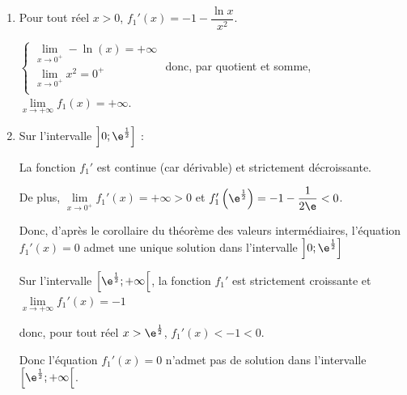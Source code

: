 \begin{enumerate}
\begin{enumerate}
			De plus $\begin{aligned}[t] f_1'\left( \e^{\frac{1}{2}}\right) & =- 1-  \dfrac{ \ln \left( \e^{\frac{1}{2}}\right)  }{ \left(\e^{\frac{1}{2}}\right)^2 }\\
			& = -1- \dfrac{ \frac{1}{2} }{ \e^1}\\
		   & = -1- \dfrac{ 1 }{ 2 \e}
		   	\end{aligned}$
	
		
		On a donc : 
	
		\hfill~
	\hfill~
		
		
		
		
		
		\item   Pour tout réel $x>0$, \quad $f_{1}'(x)= -1-\dfrac{\ln x}{x^2}$. 
		
		
		$\begin{cases}
			\lim\limits_{x\to 0^+} - \ln(x)= +\infty \\
			\lim\limits_{x\to 0^+ } {x^2}= 0^+ \\
		\end{cases}$ donc, par quotient et somme, $\lim\limits_{x \to +\infty } f_1(x)= + \infty$.  
		
		
		
		
		\item  Sur l'intervalle $\Big]0 ; \e^{\frac{1}{2}}\Big]$ :
		
		La fonction $f_1'$ est continue (car dérivable) et  strictement décroissante.
		
		De plus, $\lim\limits_{x\to 0^+ } f_1'(x) = +\infty >0 $ et $f_1'\left(\e^{\frac{1}{2}}\right) = -1 -\dfrac{1}{2\e}<0$.
		
		Donc, d'après le corollaire du théorème des valeurs intermédiaires, l'équation $f_1'(x) = 0$ admet une unique solution dans l'intervalle $\Big]0 ; \e^{\frac{1}{2}}\Big]$
		
		
		Sur l'intervalle $\Big[ \e^{\frac{1}{2}}; +\infty \Big[$, la fonction $f_1'$ est strictement croissante et $\lim\limits_{x \to +\infty} f_1'(x) =-1$ 
		
		donc, pour tout réel $x > \e^{\frac{1}{2}}$, \quad $f_1'(x) <-1 <0$. 
		
		Donc l'équation $f_1'(x) = 0$ n'admet pas de solution dans l'intervalle $\Big[ \e^{\frac{1}{2}}; +\infty \Big[$. 
		

\end{enumerate}
\end{enumerate}
